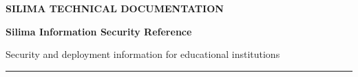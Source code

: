 \begin{flushleft}
    {\color{silimaBlue}\large\bfseries
        SILIMA TECHNICAL DOCUMENTATION}

    \vspace{0.7cm}

    {\Huge\bfseries
        Silima Information Security Reference}

    \vspace{0.4cm}

    {\color{silimaGray}
        Security and deployment information for
        educational institutions}

    \vspace{0.5cm}

    \rule{\textwidth}{0.8pt}
\end{flushleft}